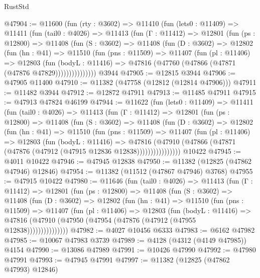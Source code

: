 \begin{lexlean}{RustStd}
\begin{coremodule}
@47904 := @11600
    (fun (rty : @3602) =>
    @11410
      (fun (lets0 : @11409) =>
      @11411
        (fun (tail0 : @4026) =>
        @11413
          (fun (Γ : @11412) =>
          @12801
            (fun (ps : @12800) =>
            @11408
              (fun (S : @3602) =>
              @11408
                (fun (D : @3602) =>
                @12802
                  (fun (hn : @41) =>
                  @11510
                    (fun (pns : @11509) =>
                    @11407
                      (fun (pl : @11406) =>
                      @12803
                        (fun (bodyL : @11416) =>
                        @47816 (@47760 (@47866 (@47871 (@47876 @47829)))))))))))))))
    @3944
@47905 := @12815 @3944
@47906 := @47905 @11400
@47910 := @11382 (@47758 (@12812 (@12814 @47906)))
@47911 := @11482 @3944
@47912 := @12872 @47911
@47913 := @11485 @47911
@47915 := @47913 @47824 @46199
@47944 := @11622
    (fun (lets0 : @11409) =>
    @11411
      (fun (tail0 : @4026) =>
      @11413
        (fun (Γ : @11412) =>
        @12801
          (fun (ps : @12800) =>
          @11408
            (fun (S : @3602) =>
            @11408
              (fun (D : @3602) =>
              @12802
                (fun (hn : @41) =>
                @11510
                  (fun (pns : @11509) =>
                  @11407
                    (fun (pl : @11406) =>
                    @12803
                      (fun (bodyL : @11416) =>
                      @47816
                        (@47910
                          (@47866 (@47871 (@47876 (@47912 (@47915 @12836 @12838))))))))))))))))
    @10422
@47945 := @4011 @10422
@47946 := @47945 @12838
@47950 := @11382 (@12825 (@47862 @47946) @12846)
@47954 := @11382 (@11512 (@47867 @47946) @3768)
@47955 := @47915 @10422
@47980 := @11646
    (fun (tail0 : @4026) =>
    @11413
      (fun (Γ : @11412) =>
      @12801
        (fun (ps : @12800) =>
        @11408
          (fun (S : @3602) =>
          @11408
            (fun (D : @3602) =>
            @12802
              (fun (hn : @41) =>
              @11510
                (fun (pns : @11509) =>
                @11407
                  (fun (pl : @11406) =>
                  @12803
                    (fun (bodyL : @11416) =>
                    @47816 (@47910 (@47950 (@47954 (@47876 (@47912 (@47955 @12838)))))))))))))))
@47982 := @4027 @10456 @6333
@47983 := @6162 @47982
@47985 := @10067 @47983 @3739
@47989 := @4128 (@4312 (@4149 @47985)) @4154
@47990 := @13086 @47989
@47991 := @10426 @47990
@47992 := @47980 @47991
@47993 := @47945 @47991
@47997 := @11382 (@12825 (@47862 @47993) @12846)

\end{coremodule}
\end{lexlean}
